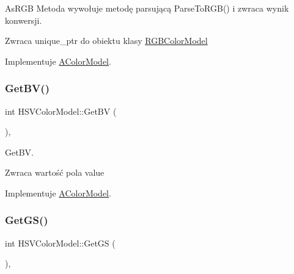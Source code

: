 As\+R\+GB Metoda wywołuje metodę parsującą Parse\+To\+R\+G\+B() i zwraca wynik konwersji. 

\begin{DoxyReturn}{Zwraca}
unique\+\_\+ptr do obiektu klasy \mbox{\hyperlink{class_r_g_b_color_model}{R\+G\+B\+Color\+Model}} 
\end{DoxyReturn}


Implementuje \mbox{\hyperlink{class_a_color_model}{A\+Color\+Model}}.

\mbox{\label{class_h_s_v_color_model_a9365e20ba9a7eeccecc17ef7494b721a}} 
\subsubsection{\texorpdfstring{Get\+B\+V()}{GetBV()}}
{\footnotesize\ttfamily int H\+S\+V\+Color\+Model\+::\+Get\+BV (\begin{DoxyParamCaption}{ }\end{DoxyParamCaption})\hspace{0.3cm}{\ttfamily [override]}, {\ttfamily [virtual]}}



Get\+BV. 

\begin{DoxyReturn}{Zwraca}
wartość pola value 
\end{DoxyReturn}


Implementuje \mbox{\hyperlink{class_a_color_model}{A\+Color\+Model}}.

\mbox{\label{class_h_s_v_color_model_a458ef47bbc34635460fe2d51ddbb858b}} 
\subsubsection{\texorpdfstring{Get\+G\+S()}{GetGS()}}
{\footnotesize\ttfamily int H\+S\+V\+Color\+Model\+::\+Get\+GS (\begin{DoxyParamCaption}{ }\end{DoxyParamCaption})\hspace{0.3cm}{\ttfamily [override]}, {\ttfamily [virtual]}}



